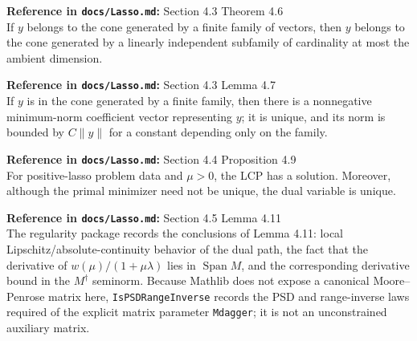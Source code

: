 \begin{theorem}\label{thm:conicCaratheodory}
  \textbf{Reference in \texttt{docs/Lasso.md}:} Section 4.3 Theorem 4.6\\
If $y$ belongs to the cone generated by a finite family of vectors, then $y$
belongs to the cone generated by a linearly independent subfamily of cardinality
at most the ambient dimension.
\end{theorem}

\begin{lemma}\label{lem:nonnegativeSolutionBound}
  \textbf{Reference in \texttt{docs/Lasso.md}:} Section 4.3 Lemma 4.7\\
If $y$ is in the cone generated by a finite family, then there is a nonnegative
minimum-norm coefficient vector representing $y$; it is unique, and its norm
is bounded by $C\|y\|$ for a constant depending only on the family.
\end{lemma}

\begin{proposition}\label{prop:lcpExistsUniqueDual}
  \textbf{Reference in \texttt{docs/Lasso.md}:} Section 4.4 Proposition 4.9\\
For positive-lasso problem data and $\mu>0$, the LCP has a solution.
Moreover, although the primal minimizer need not be unique, the dual variable is
unique.
\end{proposition}

\begin{definition}\label{def:parametricDualRegular}
  \textbf{Reference in \texttt{docs/Lasso.md}:} Section 4.5 Lemma 4.11\\
The regularity package records the conclusions of Lemma 4.11:
local Lipschitz/absolute-continuity behavior of the dual path, the fact that the
derivative of $w(\mu)/(1+\mu\lambda)$ lies in $\operatorname{Span}M$, and the
corresponding derivative bound in the $M^\dagger$ seminorm.
Because Mathlib does not expose a canonical Moore--Penrose matrix here,
\texttt{IsPSDRangeInverse} records the PSD and range-inverse laws required of
the explicit matrix parameter \texttt{Mdagger}; it is not an unconstrained
auxiliary matrix.
\end{definition}

